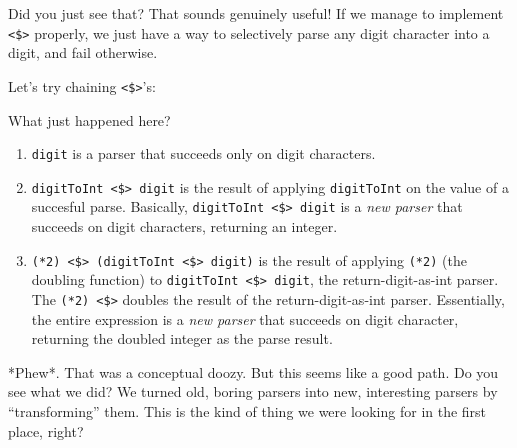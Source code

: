 \documentclass[]{article}
\newenvironment{Shaded}{}{}
\newcommand{\KeywordTok}[1]{\textcolor[rgb]{0.00,0.44,0.13}{\textbf{{#1}}}}
\newcommand{\DataTypeTok}[1]{\textcolor[rgb]{0.56,0.13,0.00}{{#1}}}
\newcommand{\DecValTok}[1]{\textcolor[rgb]{0.25,0.63,0.44}{{#1}}}
\newcommand{\StringTok}[1]{\textcolor[rgb]{0.25,0.44,0.63}{{#1}}}
\newcommand{\OtherTok}[1]{\textcolor[rgb]{0.00,0.44,0.13}{{#1}}}
\newcommand{\FunctionTok}[1]{\textcolor[rgb]{0.02,0.16,0.49}{{#1}}}
\newcommand{\NormalTok}[1]{{#1}}
\begin{document}
Did you just see that? That sounds genuinely useful! If we manage to
implement \texttt{\textless{}\$\textgreater{}} properly, we just have a
way to selectively parse any digit character into a digit, and fail
otherwise.

Let's try chaining \texttt{\textless{}\$\textgreater{}}'s:

\begin{Shaded}
\end{Shaded}

What just happened here?

\begin{enumerate}
\def\labelenumi{\arabic{enumi}.}
\tightlist
\item
  \texttt{digit} is a parser that succeeds only on digit characters.
\item
  \texttt{digitToInt\ \textless{}\$\textgreater{}\ digit} is the result
  of applying \texttt{digitToInt} on the value of a succesful parse.
  Basically, \texttt{digitToInt\ \textless{}\$\textgreater{}\ digit} is
  a \emph{new parser} that succeeds on digit characters, returning an
  integer.
\item
  \texttt{(*2)\ \textless{}\$\textgreater{}\ (digitToInt\ \textless{}\$\textgreater{}\ digit)}
  is the result of applying \texttt{(*2)} (the doubling function) to
  \texttt{digitToInt\ \textless{}\$\textgreater{}\ digit}, the
  return-digit-as-int parser. The
  \texttt{(*2)\ \textless{}\$\textgreater{}} doubles the result of the
  return-digit-as-int parser. Essentially, the entire expression is a
  \emph{new parser} that succeeds on digit character, returning the
  doubled integer as the parse result.
\end{enumerate}

*Phew*. That was a conceptual doozy. But this seems like a good path. Do
you see what we did? We turned old, boring parsers into new, interesting
parsers by ``transforming'' them. This is the kind of thing we were
looking for in the first place, right?
\end{document}
